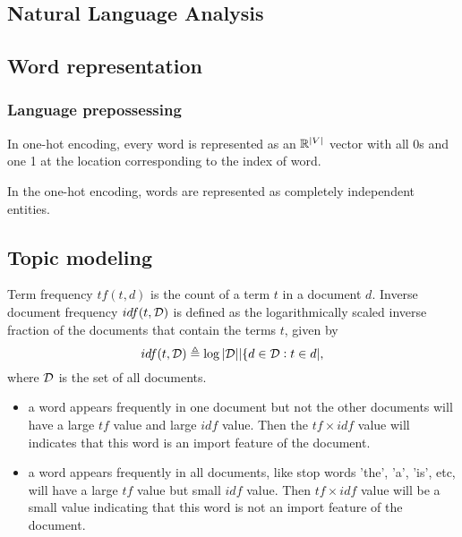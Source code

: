 \begin{refsection}
	\startcontents[chapters]	
\chapter{Natural Language Analysis}


\section{Word representation}

\subsection{Language prepossessing}

\begin{definition}
In one-hot encoding, every word is represented as an $\mathbb{R}^{|V|}$ vector with all 0s and one 1 at the location corresponding to the index of word.	
\end{definition}

In the one-hot encoding, words are represented as completely independent entities. 






\section{Topic modeling}

\begin{definition}[TF-IDF]
Term frequency $tf(t,d)$ is the count of a term $t$ in a document $d$. Inverse document frequency $idf(t, \mathcal{D})$ is defined as the logarithmically scaled inverse fraction of the documents that contain the terms $t$, given by
$$idf(t,\mathcal{D})\triangleq \log {|\mathcal{D}|}{|\{d\in \mathcal{D}: t\in d|},$$
where $\mathcal{D}$ is the set of all documents.	
\end{definition}

\begin{remark}[interpretation]\hfill
\begin{itemize}
	\item a word appears frequently in one document but not the other documents will have a large $tf$ value and large $idf$ value. Then the $tf\times idf$ value will indicates that this word is an import feature of the document. 
	\item a word appears frequently in all documents, like stop words 'the', 'a', 'is', etc, will have a large $tf$ value but small $idf$ value. Then $tf\times idf$ value will be a small value indicating that this word is not an import feature of the document. 
\end{itemize}	
\end{remark}



\end{refsection}
